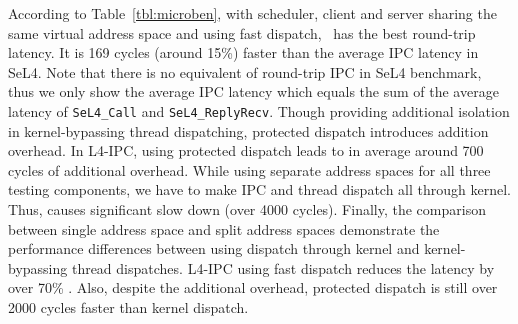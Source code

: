 According to Table~\ref{tbl:microben}, with scheduler, client and server sharing the same virtual address space and using fast dispatch, \name\ has the best round-trip latency.
It is 169 cycles (around 15\%) faster than the average IPC latency in SeL4.
Note that there is no equivalent of round-trip IPC in SeL4 benchmark, thus we only show the average IPC latency which equals the sum of the average latency of {\tt SeL4\_Call} and {\tt SeL4\_ReplyRecv}.
Though providing additional isolation in kernel-bypassing thread dispatching, protected dispatch introduces addition overhead.
In L4-IPC, using protected dispatch leads to in average around 700 cycles of additional overhead.
While using separate address spaces for all three testing components, we have to make IPC and thread dispatch all through kernel.
Thus, causes significant slow down (over 4000 cycles).
Finally, the comparison between single address space and split address spaces demonstrate the performance differences between using dispatch through kernel and kernel-bypassing thread dispatches.
L4-IPC using fast dispatch reduces the latency by over 70\% .
Also, despite the additional overhead, protected dispatch is still over 2000 cycles faster than kernel dispatch.


